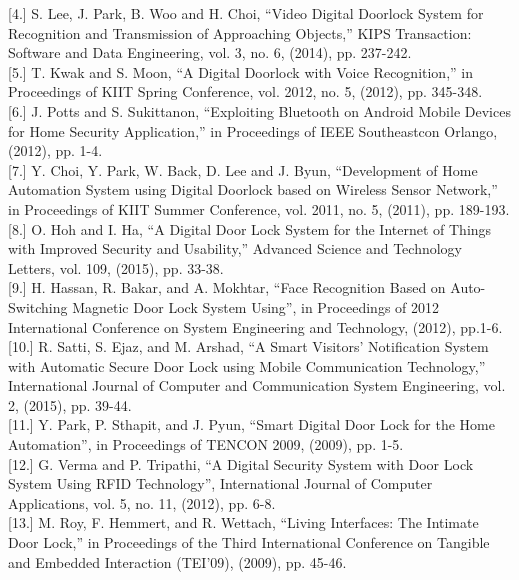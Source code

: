 \documentclass[twoside,a4paper,16pt]{book}
\begin{document}
{{			[4.]	S. Lee, J. Park, B. Woo and H. Choi, “Video Digital Doorlock System for Recognition and Transmission of Approaching Objects,” KIPS Transaction: Software and Data Engineering, vol. 3, no. 6, (2014), pp. 237-242.\\
			
			[5.]	T. Kwak and S. Moon, “A Digital Doorlock with Voice Recognition,” in Proceedings of KIIT Spring Conference, vol. 2012,  no. 5, (2012), pp. 345-348.\\
			
			[6.]	J. Potts and S. Sukittanon, “Exploiting Bluetooth on Android Mobile Devices for Home Security Application,” in Proceedings of IEEE Southeastcon Orlango, (2012), pp. 1-4.\\
			
			[7.]	Y. Choi, Y. Park, W. Back, D. Lee and J. Byun, “Development of Home Automation System using Digital Doorlock based on Wireless Sensor Network,” in Proceedings of KIIT Summer Conference, vol. 2011, no. 5, (2011), pp. 189-193.\\
			
			[8.]	O. Hoh and I. Ha, “A Digital Door Lock System for the Internet of Things with Improved Security and Usability,” Advanced Science and Technology Letters, vol. 109, (2015), pp. 33-38.\\
			
			[9.]	H. Hassan, R. Bakar, and A. Mokhtar, “Face Recognition Based on Auto-Switching Magnetic Door Lock System Using”, in Proceedings of 2012 International Conference on System Engineering and Technology, (2012), pp.1-6.\\
			
			[10.] R. Satti, S. Ejaz, and M. Arshad, “A Smart Visitors’ Notification System with Automatic Secure Door Lock using Mobile Communication Technology,” International Journal of Computer and Communication System Engineering, vol. 2, (2015), pp. 39-44.\\
			
			[11.] Y. Park, P. Sthapit, and J. Pyun, “Smart Digital Door Lock for the Home Automation”, in Proceedings of TENCON 2009, (2009), pp. 1-5.\\
			
			[12.]	G. Verma and P. Tripathi, “A Digital Security System with Door Lock System Using RFID Technology”, International Journal of Computer Applications, vol. 5, no. 11, (2012), pp. 6-8.\\
			
			[13.]	M. Roy, F. Hemmert, and R. Wettach, “Living Interfaces: The Intimate Door Lock,” in Proceedings of the Third International Conference on Tangible and Embedded Interaction (TEI'09), (2009), pp. 45-46.\\
			
}}
\end{document}
